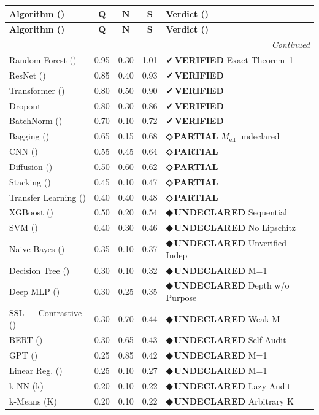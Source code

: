 \documentclass[12pt,a4paper]{article}
\theoremstyle{definition}
\newcommand{\guilty}{{\color{guiltycolor}\textbf{◆\,UNDECLARED}}}
\newcommand{\weakness}{{\color{weakcolor}\textbf{◇\,PARTIAL}}}
\newcommand{\verified}{{\color{verifiedcolor}\textbf{✓\,VERIFIED}}}
\begin{document}
\begin{longtable}{p{3.8cm} c c c p{2.5cm}}
\toprule
\textbf{Algorithm ()} & $\boldsymbol{Q}$ & $\boldsymbol{N}$ & $\boldsymbol{S}$ & \textbf{Verdict ()} \\
\midrule
\endfirsthead
\toprule
\textbf{Algorithm ()} & $\boldsymbol{Q}$ & $\boldsymbol{N}$ & $\boldsymbol{S}$ & \textbf{Verdict ()} \\
\midrule
\endhead
\midrule
\multicolumn{5}{r}{\textit{Continued}} \\
\endfoot
\bottomrule
\endlastfoot
Random Forest () & 0.95 & 0.30 & 1.01 & \verified{} Exact Theorem~1 \\
ResNet () & 0.85 & 0.40 & 0.93 & \verified{} \\
Transformer () & 0.80 & 0.50 & 0.90 & \verified{} \\
Dropout & 0.80 & 0.30 & 0.86 & \verified{} \\
BatchNorm () & 0.70 & 0.10 & 0.72 & \verified{} \\
\midrule
Bagging () & 0.65 & 0.15 & 0.68 & \weakness{} $M_{\text{eff}}$ undeclared \\
CNN () & 0.55 & 0.45 & 0.64 & \weakness{} \\
Diffusion () & 0.50 & 0.60 & 0.62 & \weakness{} \\
Stacking () & 0.45 & 0.10 & 0.47 & \weakness{} \\
Transfer Learning () & 0.40 & 0.40 & 0.48 & \weakness{} \\
\midrule
XGBoost () & 0.50 & 0.20 & 0.54 & \guilty{} Sequential \\
SVM () & 0.40 & 0.30 & 0.46 & \guilty{} No Lipschitz \\
Naive Bayes () & 0.35 & 0.10 & 0.37 & \guilty{} Unverified Indep \\
Decision Tree () & 0.30 & 0.10 & 0.32 & \guilty{} M=1 \\
Deep MLP () & 0.30 & 0.25 & 0.35 & \guilty{} Depth w/o Purpose \\
SSL — Contrastive () & 0.30 & 0.70 & 0.44 & \guilty{} Weak M \\
BERT () & 0.30 & 0.65 & 0.43 & \guilty{} Self-Audit \\
GPT () & 0.25 & 0.85 & 0.42 & \guilty{} M=1 \\
Linear Reg. () & 0.25 & 0.10 & 0.27 & \guilty{} M=1 \\
k-NN (k) & 0.20 & 0.10 & 0.22 & \guilty{} Lazy Audit \\
k-Means (K) & 0.20 & 0.10 & 0.22 & \guilty{} Arbitrary K \\

\end{longtable}
\end{document}
